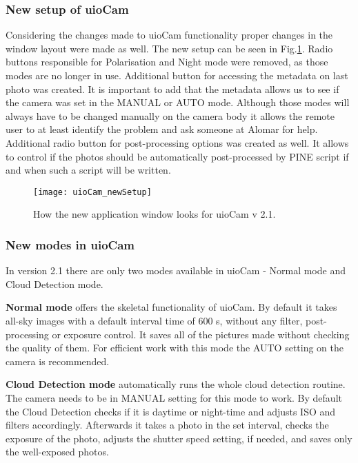 \documentclass[]{book}
\begin{document}
		\subsubsection{New setup of uioCam}

		Considering the changes made to uioCam functionality proper changes in the window layout were made as well. The new setup can be seen in Fig.\ref{fig: uioCam newSetup}. Radio buttons responsible for Polarisation and Night mode were removed, as those modes are no longer in use. Additional button for accessing the metadata on last photo was created. It is important to add that the metadata allows us to see if the camera was set in the MANUAL or AUTO mode. Although those modes will always have to be changed manually on the camera body it allows the remote user to at least identify the problem and ask someone at Alomar for help. Additional radio button for post-processing options was created as well. It allows to control if the photos should be automatically post-processed by PINE script if and when such a script will be written.
		
		\begin{figure}
			\centering
			\texttt{[image: uioCam\_newSetup]}
			\label{fig: uioCam newSetup}
			\caption{How the new application window looks for uioCam v 2.1.}
		\end{figure}

	\subsubsection{New modes in uioCam} \label{new modes}
	
		In version 2.1 there are only two modes available in uioCam - Normal mode and Cloud Detection mode.
		
		\textbf{Normal mode} offers the skeletal functionality of uioCam.  By default it takes all-sky images with a default interval time of 600 s, without any filter, post-processing or exposure control. It saves all of the pictures made without checking the quality of them. For efficient work with this mode the AUTO setting on the camera is recommended.
		
		\textbf{Cloud Detection mode} automatically runs the whole cloud detection routine. The camera needs to be in MANUAL setting for this mode to work. By default the Cloud Detection checks if it is daytime or night-time and adjusts ISO and filters accordingly. Afterwards it takes a photo in the set interval, checks the exposure of the photo, adjusts the shutter speed setting, if needed, and saves only the well-exposed photos. 
		
\end{document}
